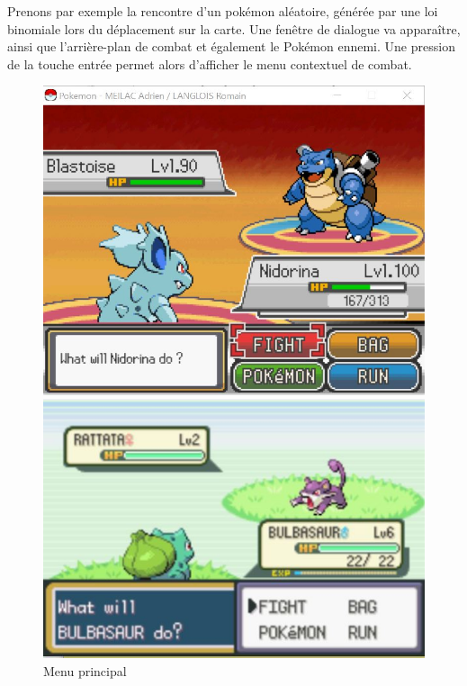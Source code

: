 \documentclass[a4paper,twoside, openany,11pt]{book}
\begin{document}
Prenons par exemple la rencontre d'un pokémon aléatoire, générée par une loi binomiale lors du déplacement sur la carte. Une fenêtre de dialogue va apparaître, ainsi que l'arrière-plan de combat et également le Pokémon ennemi. Une pression de la touche entrée permet alors d'afficher le menu contextuel de combat.

\begin{figure}[!h]
\begin{minipage}{0.49\textwidth}
\includegraphics[scale = 0.6]{Images/mainMenu.jpg}
\end{minipage}
\begin{minipage}{0.49\textwidth}
\includegraphics[scale = 0.84]{Images/vrai_jeu_mainMenu.jpg}
\end{minipage}
\caption{Menu principal}
\end{figure}
\end{document}
